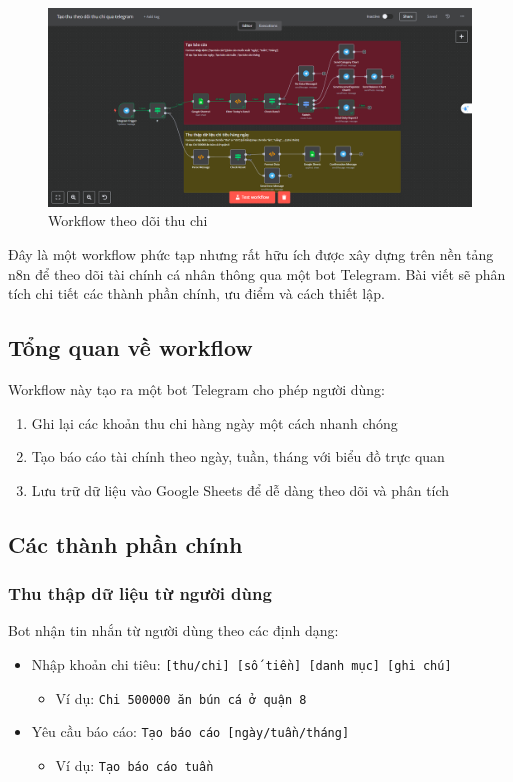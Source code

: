 \begin{figure}[h]
    \centering
    \includegraphics[width=1\textwidth]{images/3thuchi01.png}
    \caption{Workflow theo dõi thu chi}
    
\end{figure}

Đây là một workflow phức tạp nhưng rất hữu ích được xây dựng trên nền tảng n8n để theo dõi tài chính cá nhân thông qua một bot Telegram. Bài viết sẽ phân tích chi tiết các thành phần chính, ưu điểm và cách thiết lập.

\subsection{Tổng quan về workflow}

Workflow này tạo ra một bot Telegram cho phép người dùng:
\begin{enumerate}
    \item Ghi lại các khoản thu chi hàng ngày một cách nhanh chóng
    \item Tạo báo cáo tài chính theo ngày, tuần, tháng với biểu đồ trực quan
    \item Lưu trữ dữ liệu vào Google Sheets để dễ dàng theo dõi và phân tích
\end{enumerate}

\subsection{Các thành phần chính}

\subsubsection{Thu thập dữ liệu từ người dùng}
Bot nhận tin nhắn từ người dùng theo các định dạng:
\begin{itemize}
    \item Nhập khoản chi tiêu: \texttt{[thu/chi] [số tiền] [danh mục] [ghi chú]}
    \begin{itemize}
        \item Ví dụ: \texttt{Chi 500000 ăn bún cá ở quận 8}
    \end{itemize}
    \item Yêu cầu báo cáo: \texttt{Tạo báo cáo [ngày/tuần/tháng]}
    \begin{itemize}
        \item Ví dụ: \texttt{Tạo báo cáo tuần}
    \end{itemize}
\end{itemize}

